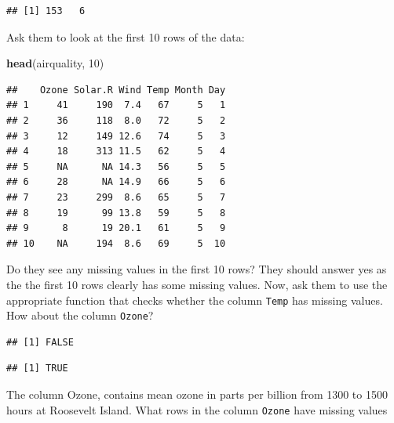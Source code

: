 \documentclass[]{book}
\newenvironment{Shaded}{\begin{snugshade}}{\end{snugshade}}
\newcommand{\DecValTok}[1]{\textcolor[rgb]{0.00,0.00,0.81}{#1}}
\newcommand{\KeywordTok}[1]{\textcolor[rgb]{0.13,0.29,0.53}{\textbf{#1}}}
\newcommand{\NormalTok}[1]{#1}
\newcommand{\OperatorTok}[1]{\textcolor[rgb]{0.81,0.36,0.00}{\textbf{#1}}}
\begin{document}
\begin{verbatim}
## [1] 153   6
\end{verbatim}

Ask them to look at the first 10 rows of the data:

\begin{Shaded}
\begin{Highlighting}[]
\KeywordTok{head}\NormalTok{(airquality, }\DecValTok{10}\NormalTok{)}
\end{Highlighting}
\end{Shaded}

\begin{verbatim}
##    Ozone Solar.R Wind Temp Month Day
## 1     41     190  7.4   67     5   1
## 2     36     118  8.0   72     5   2
## 3     12     149 12.6   74     5   3
## 4     18     313 11.5   62     5   4
## 5     NA      NA 14.3   56     5   5
## 6     28      NA 14.9   66     5   6
## 7     23     299  8.6   65     5   7
## 8     19      99 13.8   59     5   8
## 9      8      19 20.1   61     5   9
## 10    NA     194  8.6   69     5  10
\end{verbatim}

Do they see any missing values in the first 10 rows? They should answer yes as the the first 10 rows clearly has some missing values. Now, ask them to use the appropriate function that checks whether the column \texttt{Temp} has missing values. How about the column \texttt{Ozone}?

\begin{Shaded}
\end{Shaded}

\begin{verbatim}
## [1] FALSE
\end{verbatim}

\begin{Shaded}
\end{Shaded}

\begin{verbatim}
## [1] TRUE
\end{verbatim}

The column Ozone, contains mean ozone in parts per billion from 1300 to 1500 hours at Roosevelt Island. What rows in the column \texttt{Ozone} have missing values
\end{document}
